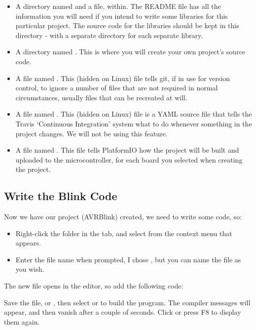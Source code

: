 \begin{itemize}
\item
  A directory named  and a file,  within.
  The README file has all the information you will need if you intend to
  write some libraries for this particular project. The source code for
  the libraries should be kept in this directory - with a separate directory for each separate library.
\item
  A directory named . This is where you will create your own
  project's source code.
\item
  A file named . This (hidden on Linux) file tells git, if in use for
  version control, to ignore a number of files that are not required in
  normal circumstances, usually files that can be recreated at will.
\item
  A file named . This (hidden on Linux) file is a YAML source file that
  tells the Travis `Continuous Integration' system what to do whenever
  something in the project changes. We will not be using this feature.
\item
  A file named . This file tells PlatformIO how the
  project will be built and uploaded to the microcontroller, for each
  board you selected when creating the project.
\end{itemize}

\subsection{Write the Blink Code}\label{write-the-blink-code}

Now we have our project (AVRBlink) created, we need to write some code, so:

\begin{itemize}
\item
  Right-click the  folder in the  tab, and select
   from the context menu that appears.
\item
  Enter the file name when prompted, I chose , but you can name
  the file as you wish.
\end{itemize}

The new file opens in the editor, so add the following code:



Save the file,  or , then select
 or  to build the program. The
compiler messages will appear, and then vanish after a couple of
seconds. Click  or press F8
to display them again.

